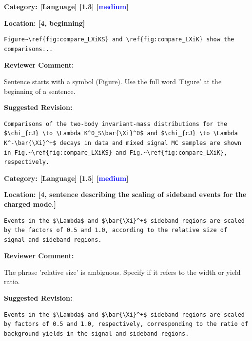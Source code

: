 \documentclass[12pt]{article}
\begin{document}
\begin{reviewer}
\noindent \textbf{Category: [Language] [1.3] [\textcolor{blue}{medium}]}

\noindent \textbf{Location: [4, beginning]}

\begin{lstlisting}[breaklines=true]
	Figure~\ref{fig:compare_LXiKS} and \ref{fig:compare_LXiK} show the comparisons...
\end{lstlisting}

\textbf{Reviewer Comment:}

Sentence starts with a symbol (Figure). Use the full word 'Figure' at the beginning of a sentence.

\textbf{Suggested Revision:}

\begin{lstlisting}[breaklines=true]
	Comparisons of the two-body invariant-mass distributions for the $\chi_{cJ} \to \Lambda K^0_S\bar{\Xi}^0$ and $\chi_{cJ} \to \Lambda K^-\bar{\Xi}^+$ decays in data and mixed signal MC samples are shown in Fig.~\ref{fig:compare_LXiKS} and Fig.~\ref{fig:compare_LXiK}, respectively.
\end{lstlisting}

\end{reviewer}

\begin{reviewer}
\noindent \textbf{Category: [Language] [1.5] [\textcolor{blue}{medium}]}

\noindent \textbf{Location: [4, sentence describing the scaling of sideband events for the charged mode.]}

\begin{lstlisting}[breaklines=true]
	Events in the $\Lambda$ and $\bar{\Xi}^+$ sideband regions are scaled by the factors of 0.5 and 1.0, according to the relative size of signal and sideband regions.
\end{lstlisting}

\textbf{Reviewer Comment:}

The phrase 'relative size' is ambiguous. Specify if it refers to the width or yield ratio.

\textbf{Suggested Revision:}

\begin{lstlisting}[breaklines=true]
	Events in the $\Lambda$ and $\bar{\Xi}^+$ sideband regions are scaled by factors of 0.5 and 1.0, respectively, corresponding to the ratio of background yields in the signal and sideband regions.
\end{lstlisting}

\end{reviewer}
\end{document}
